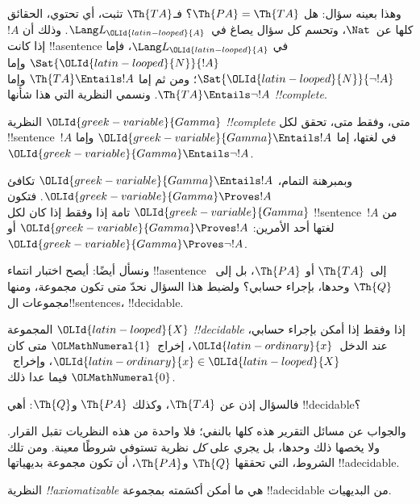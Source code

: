 \documentclass[../../../include/open-logic-section]{subfiles}
\begin{document}
وهذا بعينه سؤال: هل $\Th{PA}=\Th{TA}$؟
فـ$\Th{TA}$ تثبت، أي تحتوي، الحقائق كلها عن~$\Nat$،
وتحسم كل سؤال يصاغ في~$\Lang L_{\OLId{latin-looped}{A}}$. وذلك أن $!A$
إذا كانت !!a{sentence} في $\Lang L_{\OLId{latin-looped}{A}}$، فإما
$\Sat{{\OLId{latin-looped}{N}}}{!A}$ وإما $\Sat{{\OLId{latin-looped}{N}}}{\lnot !A}$؛ ومن ثم
إما $\Th{TA}\Entails !A$ وإما $\Th{TA}\Entails\lnot !A$.
ونسمي النظرية التي هذا شأنها \emph{!!{complete}}.

\begin{defn}
النظرية ${\OLId{greek-variable}{Gamma}}$ \emph{!!{complete}} متى، وفقط متى، تحقق لكل
!!{sentence}~$!A$ في لغتها، إما ${\OLId{greek-variable}{Gamma}}\Entails !A$ وإما
${\OLId{greek-variable}{Gamma}}\Entails\lnot !A$.
\end{defn}

\begin{explain}
وبمبرهنة التمام، ${\OLId{greek-variable}{Gamma}}\Entails !A$ تكافئ
${\OLId{greek-variable}{Gamma}}\Proves !A$. فتكون ${\OLId{greek-variable}{Gamma}}$ تامة إذا وفقط إذا
كان لكل !!{sentence}~$!A$ من لغتها أحد الأمرين:
${\OLId{greek-variable}{Gamma}}\Proves !A$ أو ${\OLId{greek-variable}{Gamma}}\Proves\lnot !A$.
\end{explain}

ونسأل أيضًا: أيصح اختبار انتماء !!a{sentence}
إلى~$\Th{TA}$ أو $\Th{PA}$، بل إلى~$\Th{Q}$ وحدها،
بإجراء حسابي؟ ولضبط هذا السؤال نحدّ متى تكون مجموعة،
ومنها مجموعات ال!!{sentence}s، !!{decidable}.

\begin{defn}
المجموعة ${\OLId{latin-looped}{X}}$ \emph{!!{decidable}} إذا وفقط إذا أمكن
بإجراء حسابي، عند الدخل~${\OLId{latin-ordinary}{x}}$، إخراج~${\OLMathNumeral{1}}$ متى كان
${\OLId{latin-ordinary}{x}}\in {\OLId{latin-looped}{X}}$، وإخراج~${\OLMathNumeral{0}}$ فيما عدا ذلك.
\end{defn}

فالسؤال إذن عن $\Th{TA}$، وكذلك $\Th{PA}$ و$\Th{Q}$:
أهي !!{decidable}؟

والجواب عن مسائل التقرير هذه كلها بالنفي؛ فلا واحدة
من هذه النظريات تقبل القرار. ولا يخصها ذلك وحدها،
بل يجري على \emph{كل} نظرية تستوفي شروطًا معينة.
ومن تلك الشروط، التي تحققها $\Th{Q}$ و$\Th{PA}$،
أن تكون مجموعة بديهياتها !!a{decidable}.

\begin{defn}
النظرية \emph{!!{axiomatizable}} هي ما أمكن أكسَمته بمجموعة
!!a{decidable} من البديهيات.
\end{defn}
\end{document}
